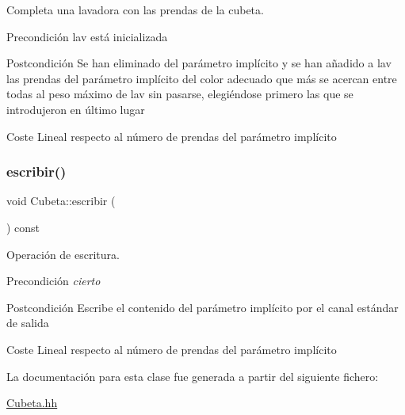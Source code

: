 Completa una lavadora con las prendas de la cubeta. 

\begin{DoxyPrecond}{Precondición}
lav está inicializada 
\end{DoxyPrecond}
\begin{DoxyPostcond}{Postcondición}
Se han eliminado del parámetro implícito y se han añadido a lav las prendas del parámetro implícito del color adecuado que más se acercan entre todas al peso máximo de lav sin pasarse, elegiéndose primero las que se introdujeron en último lugar 
\end{DoxyPostcond}
\begin{DoxyParagraph}{Coste}
Lineal respecto al número de prendas del parámetro implícito 
\end{DoxyParagraph}
\mbox{\label{class_cubeta_a3153ac390389f689bead058cd0b1690e}} 
\subsubsection{\texorpdfstring{escribir()}{escribir()}}
{\footnotesize\ttfamily void Cubeta\+::escribir (\begin{DoxyParamCaption}{ }\end{DoxyParamCaption}) const}



Operación de escritura. 

\begin{DoxyPrecond}{Precondición}
{\itshape cierto} 
\end{DoxyPrecond}
\begin{DoxyPostcond}{Postcondición}
Escribe el contenido del parámetro implícito por el canal estándar de salida 
\end{DoxyPostcond}
\begin{DoxyParagraph}{Coste}
Lineal respecto al número de prendas del parámetro implícito 
\end{DoxyParagraph}


La documentación para esta clase fue generada a partir del siguiente fichero\+:\begin{DoxyCompactItemize}
\item 
\hyperlink{_cubeta_8hh}{Cubeta.\+hh}\end{DoxyCompactItemize}
